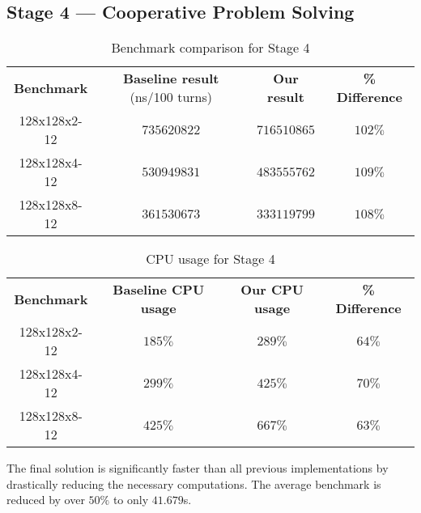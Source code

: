 \documentclass[10pt,a4paper,dvipsnames,cmyk]{scrartcl}
\begin{document}
\subsection*{Stage 4 --- Cooperative Problem Solving}%
\label{sub:coop-solving}
\begin{table}[!htb]
\caption{Benchmark comparison for Stage 4}
\begin{center}
    \begin{tabular}{|c|c|c|c|}
        \hline
        \textbf{Benchmark} & \textbf{Baseline result} (ns/100 turns) &
        \textbf{Our result} & \textbf{\% Difference} \\ \hhline{|=|=|=|=|}
        128x128x2-12 & $735620822$ & $716510865$ & $102\%$ \\ \hline
        128x128x4-12 & $530949831$ & $483555762$ & $109\%$ \\ \hline
        128x128x8-12 & $361530673$ & $333119799$ & $108\%$ \\ \hline
    \end{tabular}
\end{center}
\end{table}
\begin{table}[!htb]
\caption{CPU usage for Stage 4}
\begin{center}
    \begin{tabular}{|c|c|c|c|}
        \hline
        \textbf{Benchmark} & \textbf{Baseline CPU usage} &
        \textbf{Our CPU usage} & \textbf{\% Difference} \\ \hhline{|=|=|=|=|}
        128x128x2-12 & $185\%$ & $289\%$ & $64\%$ \\ \hline
        128x128x4-12 & $299\%$ & $425\%$ & $70\%$ \\ \hline
        128x128x8-12 & $425\%$ & $667\%$ & $63\%$ \\ \hline
    \end{tabular}
\end{center}
\end{table}




The final solution is significantly faster than all previous
implementations by drastically reducing the necessary computations. The
average benchmark is reduced by over $50\%$ to only $41.679$s.

\end{document}
